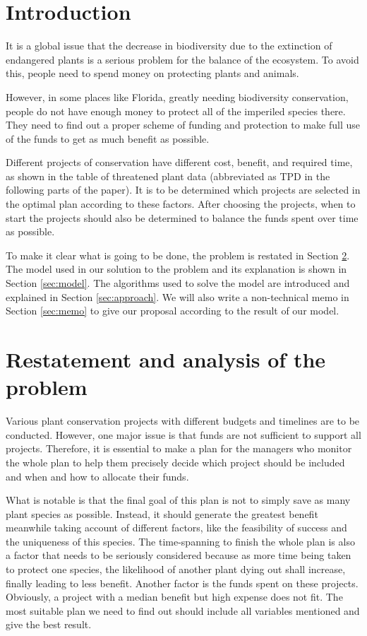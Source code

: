 \documentclass{article}
\begin{document}
\newpage
\section{Introduction}
\label{sec:intro}

It is a global issue that the decrease in biodiversity due to the extinction of endangered plants is a serious problem for the balance of the ecosystem.
To avoid this, people need to spend money on protecting plants and animals.

However, in some places like Florida, greatly needing biodiversity conservation,
people do not have enough money to protect all of the imperiled species there.
They need to find out a proper scheme of funding and protection to make full use of the funds to get as much benefit as possible.

Different projects of conservation have different cost, benefit, and required time,
as shown in the table of threatened plant data (abbreviated as TPD in the following parts of the paper).
It is to be determined which projects are selected in the optimal plan according to these factors.
After choosing the projects, when to start the projects should also be determined to balance the funds spent over time as possible.

To make it clear what is going to be done, the problem is restated in Section \ref{sec:restatement}.
The model used in our solution to the problem and its explanation is shown in Section \ref{sec:model}.
The algorithms used to solve the model are introduced and explained in Section \ref{sec:approach}.
We will also write a non-technical memo in Section \ref{sec:memo} to give our proposal according to the result of our model.

\section{Restatement and analysis of the problem}
\label{sec:restatement}

Various plant conservation projects with different budgets and timelines are to be conducted.
However, one major issue is that funds are not sufficient to support all projects.
Therefore, it is essential to make a plan for the managers who monitor the whole plan to help them precisely decide which project should be included and when and how to allocate their funds.

What is notable is that the final goal of this plan is not to simply save as many plant species as possible.
Instead, it should generate the greatest benefit meanwhile taking account of different factors, like the feasibility of success and the uniqueness of this species.
The time-spanning to finish the whole plan is also a factor that needs to be seriously considered because as more time being taken to protect one species, the likelihood of another plant dying out shall increase, finally leading to less benefit.
Another factor is the funds spent on these projects.
Obviously, a project with a median benefit but high expense does not fit.
The most suitable plan we need to find out should include all variables mentioned and give the best result.
\end{document}

